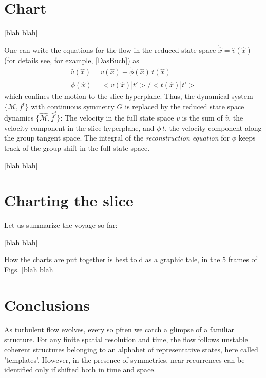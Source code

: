 \documentclass{article}
\begin{document}
\section{Chart}
\label{s:slice}

 [blah blah]

One can write the equations for the flow in the reduced state space
$\dot{\hat{x}} = \hat{v}(\hat{x})$ (for details see, for example,
\ref{DasBuch}) as
\begin{align}
\hat{v}(\hat{x}) = v(\hat{x})-\dot{\phi}(\hat{x}) \, t(\hat{x})
\label{2modesEqMotMFrame}\\
\dot{\phi}(\hat{x}) = <v(\hat{x})|t'>
                       /<t(\hat{x})|t'>
\label{2modesreconstrEq}
\end{align}
which confines the motion to the slice hyperplane. Thus, the dynamical
system $\{\mathcal{M},f^t\}$ with continuous symmetry $G$ is replaced by
the reduced state space dynamics $\{\hat{\mathcal{M}},\hat{f}^t\}$: The velocity in the
full state space $v$ is the sum of $\hat{v}$, the velocity component in
the slice hyperplane, and $\dot{\phi}\,t$, the velocity
component along the group tangent space. The integral of the {\em
reconstruction equation} for $\dot{\phi}$ keeps track of the group
shift in the full state space.


 [blah blah]

\section{Charting the slice}
\label{s:chart}

Let us summarize the voyage so far:

 [blah blah]


How the charts are put together is best told as a graphic tale, in the 5
frames of Figs.  [blah blah]



\section{Conclusions}
\label{s:concl}
As turbulent flow evolves, every so pften we catch a glimpse of a familiar structure. For any finite spatial resolution and time, the flow follows unstable coherent structures belonging to an alphabet of representative states, here called 'templates'. However, in the presence of symmetries, near recurrences can be identified only if shifted both in time and space.
\end{document}
